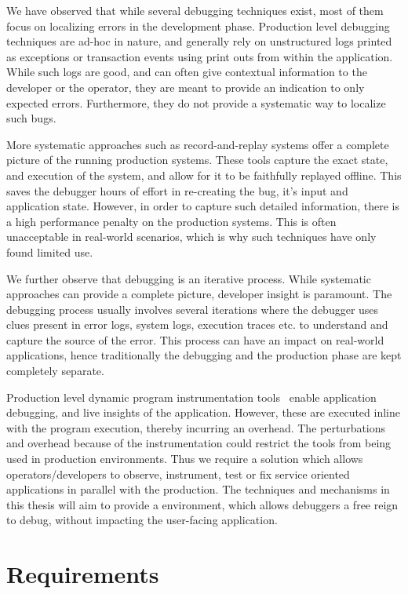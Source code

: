 We have observed that while several debugging techniques exist, most of them focus on localizing errors in the development phase.
Production level debugging techniques are ad-hoc in nature, and generally rely on unstructured logs printed as exceptions or transaction events using print outs from within the application.
While such logs are good, and can often give contextual information to the developer or the operator, they are meant to provide an indication to only expected errors.
Furthermore, they do not provide a systematic way to localize such bugs.

More systematic approaches such as record-and-replay systems offer a complete picture of the running production systems.
These tools capture the exact state, and execution of the system, and allow for it to be faithfully replayed offline.
This saves the debugger hours of effort in re-creating the bug, it's input and application state.
However, in order to capture such detailed information, there is a high performance penalty on the production systems.
This is often unacceptable in real-world scenarios, which is why such techniques have only found limited use.

We further observe that debugging is an iterative process.
While systematic approaches can provide a complete picture, developer insight is paramount.
The debugging process usually involves several iterations where the debugger uses clues present in error logs, system logs, execution traces etc. to understand and capture the source of the error.
This process can have an impact on real-world applications, hence traditionally the debugging and the production phase are kept completely separate.

Production level dynamic program instrumentation tools~\cite{dtrace,systemtap,winetw} enable application debugging, and live insights of the application. 
However, these are executed inline with the program execution, thereby incurring an overhead.
The perturbations and overhead because of the instrumentation could restrict the tools from being used in production environments. 
Thus we require a solution which allows operators/developers to observe, instrument, test or fix service oriented applications in parallel with the production. 
The techniques and mechanisms in this thesis will aim to provide a \livedebugging environment, which allows debuggers a free reign to debug, without impacting the user-facing application.

\section{Requirements}
\label{sec:introRequirements}

